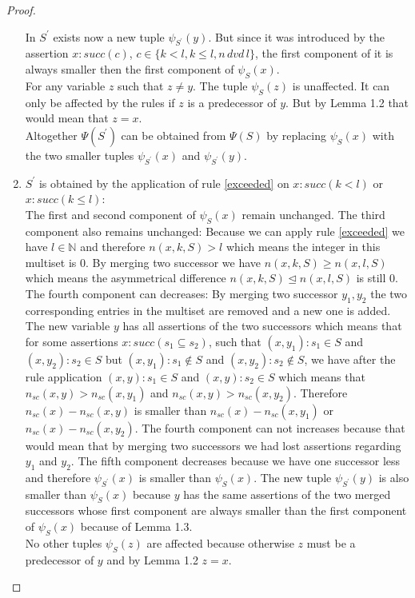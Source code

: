 \documentclass[a4paper,11pt]{scrartcl}
\theoremstyle{break}
\theoremstyle{definition}
\begin{document}
\begin{proof}
\begin{enumerate}
In $S^\prime$ exists now a new tuple $\psi_{S^\prime}(y)$. But since it was introduced by the assertion $x:succ(c)$, $c\in\{k<l,k\leq l,n\,dvd\,l\}$, the first component of it is always smaller then the first component of $\psi_S(x)$.\\
For any variable $z$ such that $z\neq y$. The tuple $\psi_S(z)$ is unaffected. It can only be affected by the rules if $z$ is a predecessor of $y$. But by Lemma 1.2 that would mean that $z=x$.\\
Altogether $\Psi(S^\prime)$ can be obtained from $\Psi(S)$ by replacing $\psi_S(x)$ with the two smaller tuples $\psi_{S^\prime}(x)$ and $\psi_{S^\prime}(y)$.
\item $S^\prime$ is obtained by the application of rule \ref{exceeded} on $x:succ(k<l)$ or $x:succ(k\leq l)$:\\
The first and second component of $\psi_S(x)$ remain unchanged. The third component also remains unchanged: Because we can apply rule \ref{exceeded} we have $l\in\mathbb{N}$ and therefore $n(x,k,S)>l$ which means the integer in this multiset is $0$. By merging two successor we have $n(x,k,S)\geq n(x,l,S)$ which means the asymmetrical difference $n(x,k,S)\unlhd  n(x,l,S)$ is still $0$. The fourth component can decreases: By merging two successor $y_1, y_2$ the two corresponding entries in the multiset are removed and a new one is added. The new variable $y$ has all assertions of the two successors which means that for some assertions $x:succ(s_1\subseteq s_2)$, such that $(x,y_1):s_1\in S$ and $(x,y_2):s_2\in S$ but $(x,y_1):s_1\not\in S$ and $(x,y_2):s_2\not\in S$, we have after the rule application $(x,y):s_1\in S$ and $(x,y):s_2\in S$ which means that $n_{sc}(x,y)>n_{sc}(x,y_1)$ and $n_{sc}(x,y)>n_{sc}(x,y_2)$. Therefore $n_{sc}(x)-n_{sc}(x,y)$ is smaller than $n_{sc}(x)-n_{sc}(x,y_1)$ or $n_{sc}(x)-n_{sc}(x,y_2)$. The fourth component can not increases because that would mean that by merging two successors we had lost assertions regarding $y_1$ and $y_2$. The fifth component decreases because we have one successor less and therefore $\psi_{S^\prime}(x)$ is smaller than $\psi_S(x)$. The new tuple $\psi_{S^\prime}(y)$ is also smaller than $\psi_S(x)$ because $y$ has the same assertions of the two merged successors whose first component are always smaller than the first component of $\psi_S(x)$ because of Lemma 1.3.\\
No other tuples $\psi_S(z)$ are affected because otherwise $z$ must be a predecessor of $y$ and by Lemma 1.2 $z=x$.\\

\end{enumerate}
\end{proof}
\end{document}
